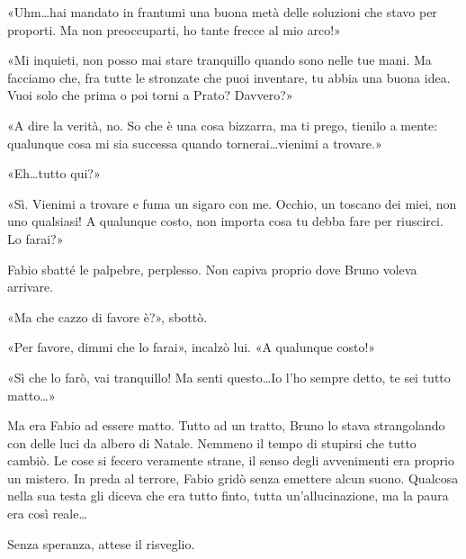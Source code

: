 «Uhm\ldots hai mandato in frantumi una buona metà delle soluzioni che stavo per proporti. Ma non preoccuparti, ho tante frecce al mio arco!»

«Mi inquieti, non posso mai stare tranquillo quando sono nelle tue mani. Ma facciamo che, fra tutte le stronzate che puoi inventare, tu abbia una buona idea. Vuoi solo che prima o poi torni a Prato? Davvero?»

«A dire la verità, no. So che è una cosa bizzarra, ma ti prego, tienilo a mente: qualunque cosa mi sia successa quando tornerai\ldots vienimi a trovare.»

«Eh\ldots tutto qui?»

«Sì. Vienimi a trovare e fuma un sigaro con me. Occhio, un toscano dei miei, non uno qualsiasi! A qualunque costo, non importa cosa tu debba fare per riuscirci. Lo farai?»

Fabio sbatté le palpebre, perplesso. Non capiva proprio dove Bruno voleva arrivare.

«Ma che cazzo di favore è?», sbottò.

«Per favore, dimmi che lo farai», incalzò lui. «A qualunque costo!»

«Sì che lo farò, vai tranquillo! Ma senti questo\ldots Io l'ho sempre detto, te sei tutto matto\ldots»

Ma era Fabio ad essere matto. Tutto ad un tratto, Bruno lo stava strangolando con delle luci da albero di Natale. Nemmeno il tempo di stupirsi che tutto cambiò. Le cose si fecero veramente strane, il senso degli avvenimenti era proprio un mistero. In preda al terrore, Fabio gridò senza emettere alcun suono. Qualcosa nella sua testa gli diceva che era tutto finto, tutta un'allucinazione, ma la paura era così reale\ldots

Senza speranza, attese il risveglio.
